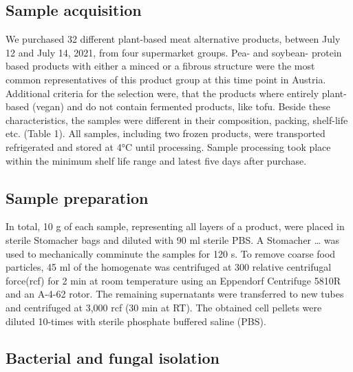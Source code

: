 \documentclass[preprint, 3p,
authoryear]{elsarticle} %
\begin{document}
\hypertarget{sample-acquisition}{%
\subsection{Sample acquisition}\label{sample-acquisition}}

We purchased 32 different plant-based meat alternative products, between
July 12 and July 14, 2021, from four supermarket groups. Pea- and
soybean- protein based products with either a minced or a fibrous
structure were the most common representatives of this product group at
this time point in Austria. Additional criteria for the selection were,
that the products where entirely plant-based (vegan) and do not contain
fermented products, like tofu. Beside these characteristics, the samples
were different in their composition, packing, shelf-life etc. (Table 1).
All samples, including two frozen products, were transported
refrigerated and stored at 4°C until processing. Sample processing took
place within the minimum shelf life range and latest five days after
purchase.

\hypertarget{sample-preparation}{%
\subsection{Sample preparation}\label{sample-preparation}}

In total, 10 g of each sample, representing all layers of a product,
were placed in sterile Stomacher bags and diluted with 90 ml sterile
PBS. A Stomacher \ldots{} was used to mechanically comminute the samples
for 120 s. To remove coarse food particles, 45 ml of the homogenate was
centrifuged at 300 relative centrifugal force(rcf) for 2 min at room
temperature using an Eppendorf Centrifuge 5810R and an A-4-62 rotor. The
remaining supernatants were transferred to new tubes and centrifuged at
3,000 rcf (30 min at RT). The obtained cell pellets were diluted
10-times with sterile phosphate buffered saline (PBS).

\hypertarget{bacterial-and-fungal-isolation}{%
\subsection{Bacterial and fungal
isolation}\label{bacterial-and-fungal-isolation}}
\end{document}

